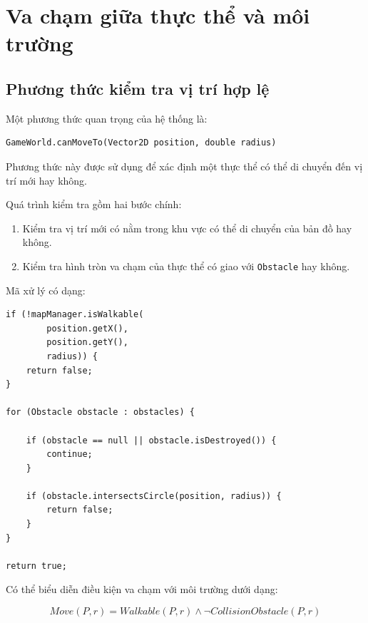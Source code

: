 \documentclass[12pt,a4paper]{report}
\begin{document}


    \section{Va chạm giữa thực thể và môi trường}

    \subsection{Phương thức kiểm tra vị trí hợp lệ}

    Một phương thức quan trọng của hệ thống là:

    \begin{verbatim}
GameWorld.canMoveTo(Vector2D position, double radius)
    \end{verbatim}

    Phương thức này được sử dụng để xác định một thực thể có thể di chuyển
    đến vị trí mới hay không.

    Quá trình kiểm tra gồm hai bước chính:

    \begin{enumerate}
        \item Kiểm tra vị trí mới có nằm trong khu vực có thể di chuyển
        của bản đồ hay không.
        \item Kiểm tra hình tròn va chạm của thực thể có giao với
        \texttt{Obstacle} hay không.
    \end{enumerate}

    Mã xử lý có dạng:

    \begin{verbatim}
if (!mapManager.isWalkable(
        position.getX(),
        position.getY(),
        radius)) {
    return false;
}

for (Obstacle obstacle : obstacles) {

    if (obstacle == null || obstacle.isDestroyed()) {
        continue;
    }

    if (obstacle.intersectsCircle(position, radius)) {
        return false;
    }
}

return true;
    \end{verbatim}

    Có thể biểu diễn điều kiện va chạm với môi trường dưới dạng:

    \[
        Move(P,r)
        =
        Walkable(P,r)
        \land
        \neg CollisionObstacle(P,r)
    \]
\end{document}
